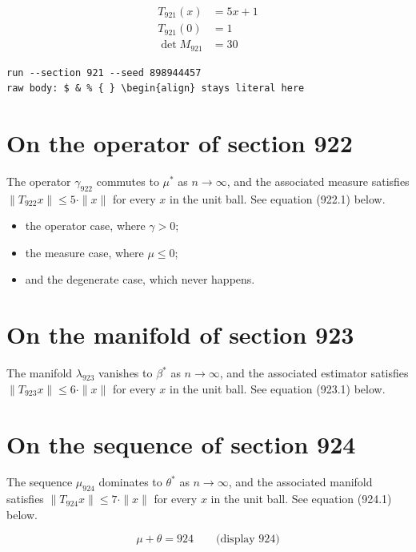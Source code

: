 \documentclass{article}
\begin{document}
\begin{align}
T_{921}(x) &= 5 x + 1 \\
T_{921}(0) &= 1 \\
\det M_{921} &= 30
\end{align}

\begin{verbatim}
run --section 921 --seed 898944457
raw body: $ & % { } \begin{align} stays literal here
\end{verbatim}

\section{On the operator of section 922}
The operator $\gamma_{922}$ commutes to $\mu^{*}$ as $n \to \infty$,
and the associated measure satisfies $\|T_{922} x\| \leq 5 \cdot \|x\|$
for every $x$ in the unit ball. See equation (922.1) below.

\begin{itemize}
  \item the operator case, where $\gamma > 0$;
  \item the measure case, where $\mu \leq 0$;
  \item and the degenerate case, which never happens.
\end{itemize}

\section{On the manifold of section 923}
The manifold $\lambda_{923}$ vanishes to $\beta^{*}$ as $n \to \infty$,
and the associated estimator satisfies $\|T_{923} x\| \leq 6 \cdot \|x\|$
for every $x$ in the unit ball. See equation (923.1) below.

\section{On the sequence of section 924}
The sequence $\mu_{924}$ dominates to $\theta^{*}$ as $n \to \infty$,
and the associated manifold satisfies $\|T_{924} x\| \leq 7 \cdot \|x\|$
for every $x$ in the unit ball. See equation (924.1) below.

$$
\mu + \theta = 924 \qquad \text{(display 924)}
$$
\end{document}
